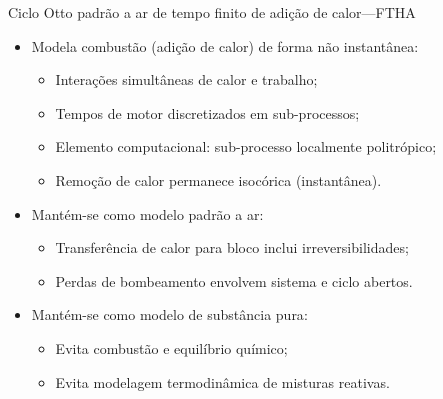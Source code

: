     \begin{frame}{Ciclo Otto padrão a ar de tempo finito de adição de calor---FTHA}\vspace*{-2em}
        \begin{itemize}
            \item<1->  Modela combustão (adição de calor) de forma \alert{não instantânea}:
            \begin{itemize}
                \item<2->  Interações \alert{simultâneas} de \alert{calor} e \alert{trabalho};
                \item<3->  Tempos de motor \alert{discretizados} em \alert{sub-processos};
                \item<4->  Elemento computacional: sub-processo \alert{localmente politrópico};
                \item<5->  \alert{Remoção} de calor permanece \alert{isocórica} (instantânea).
            \end{itemize}
            \item<6->  Mantém-se como modelo \alert{padrão a ar}:
            \begin{itemize}
                \item<7->  Transferência de calor para bloco inclui \alert{irreversibilidades};
                \item<8->  Perdas de bombeamento envolvem \alert{sistema e ciclo abertos}.
            \end{itemize}
            \item<9->  Mantém-se como modelo de \alert{substância pura}:
            \begin{itemize}
                \item<10-> Evita \alert{combustão e equilíbrio químico};
                \item<11-> Evita modelagem termodinâmica de \alert{misturas reativas}.
            \end{itemize}
        \end{itemize}
    \end{frame}

